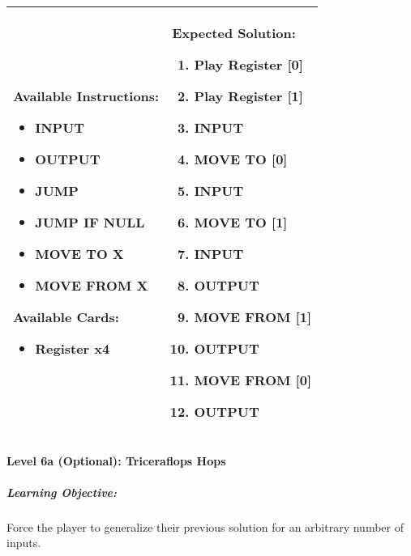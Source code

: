 \begin{center}
    \begin{tabular}{ | m{6cm} | m{8cm} | } 
        \hline
            \textbf{Available Instructions:} 
            \begin{itemize}
                \setlength\itemsep{-.35em}
                \item INPUT
                \item OUTPUT
                \item JUMP
                \item JUMP IF NULL
                \item MOVE TO X
                \item MOVE FROM X
            \end{itemize}
            \textbf{Available Cards:} 
            \begin{itemize}
                \setlength\itemsep{-.35em}
                \item Register x4
            \end{itemize}& 
            \textbf{Expected Solution:} 
            \begin{enumerate}
                \setlength\itemsep{-.35em}
                \item Play Register [0]
                \item Play Register [1]
                \item INPUT
                \item MOVE TO [0]
                \item INPUT
                \item MOVE TO [1]
                \item INPUT
                \item OUTPUT
                \item MOVE FROM [1] 
                \item OUTPUT
                \item MOVE FROM [0] 
                \item OUTPUT
            \end{enumerate}
            \\
        \hline
    \end{tabular}
\end{center}


\paragraph{Level 6a (Optional): Triceraflops Hops}
\subparagraph{Learning Objective:} Force the player to generalize their previous solution for an arbitrary number of inputs.

